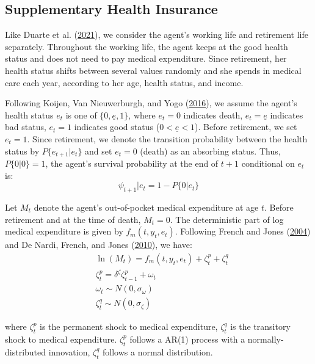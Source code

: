 \documentclass[
  12pt,
]{article}
\begin{document}
\hypertarget{supplementary-health-insurance}{%
\subsection{Supplementary Health
Insurance}\label{supplementary-health-insurance}}

Like Duarte et al. (\protect\hyperlink{ref-duarte_simple_2021}{2021}),
we consider the agent's working life and retirement life separately.
Throughout the working life, the agent keeps at the good health status
and does not need to pay medical expenditure. Since retirement, her
health status shifts between several values randomly and she spends in
medical care each year, according to her age, health status, and income.

Following Koijen, Van Nieuwerburgh, and Yogo
(\protect\hyperlink{ref-koijen_health_2016}{2016}), we assume the
agent's health status \(e_t\) is one of \(\{0,\underline{e},1\}\), where
\(e_t=0\) indicates death, \(e_t=\underline{e}\) indicates bad status,
\(e_t =1\) indicates good status (\(0<\underline{e}<1\)). Before
retirement, we set \(e_t=1\). Since retirement, we denote the transition
probability between the health status by \(P\{e_{t+1}|e_t\}\) and set
\(e_t=0\) (death) as an absorbing status. Thus, \(P\{0|0\}=1\), the
agent's survival probability at the end of \(t+1\) conditional on
\(e_t\) is: \begin{equation}
\psi_{t+1}|e_t = 1-P\{0|e_t\}
\end{equation}

Let \(M_t\) denote the agent's out-of-pocket medical expenditure at age
\(t\). Before retirement and at the time of death, \(M_t=0\). The
deterministic part of log medical expenditure is given by
\(f_m(t,y_t,e_t)\). Following French and Jones
(\protect\hyperlink{ref-french_distribution_2004}{2004}) and De Nardi,
French, and Jones (\protect\hyperlink{ref-de_nardi_why_2010}{2010}), we
have: \begin{equation}
\begin{aligned}
& \ln(M_t)=f_m(t,y_t,e_t)+\zeta^p_t + \zeta^q_t \\
& \zeta^p_t = \delta^{\zeta}\zeta^p_{t-1}+\omega_t \\
& \omega_t \sim N(0,\sigma_{\omega})\\
& \zeta^q_t \sim N(0,\sigma_{\zeta})
\end{aligned}
\end{equation}

where \(\zeta^p_t\) is the permanent shock to medical expenditure,
\(\zeta^q_t\) is the transitory shock to medical expenditure.
\(\zeta^p_t\) follows a AR(1) process with a normally-distributed
innovation, \(\zeta^q_t\) follows a normal distribution.
\end{document}
